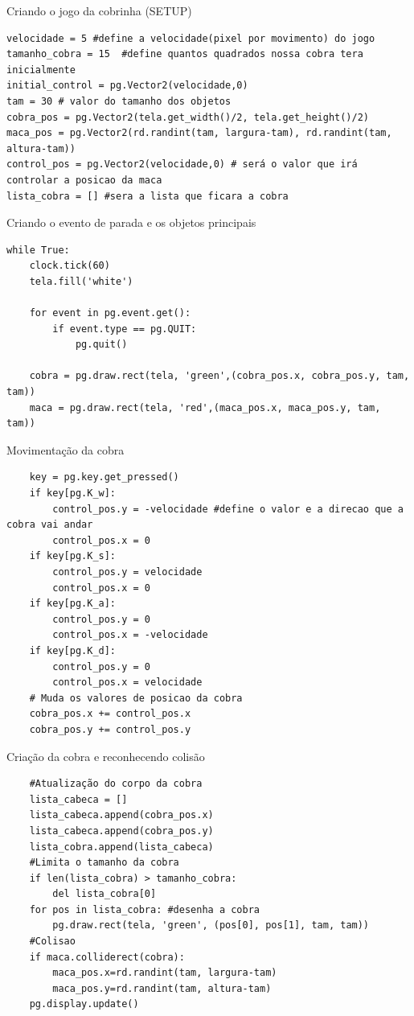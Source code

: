 \documentclass[fleqn,utf8,aspectratio=169,14pt]{beamer}
\begin{document}
	\begin{frame}[fragile]{Criando o jogo da cobrinha (SETUP)}
		
		\begin{lstlisting}
velocidade = 5 #define a velocidade(pixel por movimento) do jogo
tamanho_cobra = 15  #define quantos quadrados nossa cobra tera inicialmente
initial_control = pg.Vector2(velocidade,0)
tam = 30 # valor do tamanho dos objetos
cobra_pos = pg.Vector2(tela.get_width()/2, tela.get_height()/2)
maca_pos = pg.Vector2(rd.randint(tam, largura-tam), rd.randint(tam, altura-tam))
control_pos = pg.Vector2(velocidade,0) # será o valor que irá controlar a posicao da maca
lista_cobra = [] #sera a lista que ficara a cobra
		\end{lstlisting}
	\end{frame}
	
	\begin{frame}[fragile]{Criando o evento de parada e os objetos principais}
		\begin{lstlisting}
while True:   
	clock.tick(60)
	tela.fill('white')
	
	for event in pg.event.get():
		if event.type == pg.QUIT:
			pg.quit()
	
	cobra = pg.draw.rect(tela, 'green',(cobra_pos.x, cobra_pos.y, tam, tam))
	maca = pg.draw.rect(tela, 'red',(maca_pos.x, maca_pos.y, tam, tam))
		\end{lstlisting}
	\end{frame}
	
	\begin{frame}[fragile]{Movimentação da cobra}
		\begin{lstlisting}
	key = pg.key.get_pressed()
	if key[pg.K_w]:
		control_pos.y = -velocidade #define o valor e a direcao que a cobra vai andar
		control_pos.x = 0
	if key[pg.K_s]:
		control_pos.y = velocidade
		control_pos.x = 0
	if key[pg.K_a]:
		control_pos.y = 0
		control_pos.x = -velocidade
	if key[pg.K_d]:
		control_pos.y = 0
		control_pos.x = velocidade
	# Muda os valores de posicao da cobra
	cobra_pos.x += control_pos.x 
	cobra_pos.y += control_pos.y
		\end{lstlisting}
	\end{frame}
	
	\begin{frame}[fragile]{Criação da cobra e reconhecendo colisão}
		\begin{lstlisting}
	#Atualização do corpo da cobra
	lista_cabeca = []
	lista_cabeca.append(cobra_pos.x)
	lista_cabeca.append(cobra_pos.y)
	lista_cobra.append(lista_cabeca)
	#Limita o tamanho da cobra
	if len(lista_cobra) > tamanho_cobra:
		del lista_cobra[0]
	for pos in lista_cobra: #desenha a cobra
		pg.draw.rect(tela, 'green', (pos[0], pos[1], tam, tam))
	#Colisao
	if maca.colliderect(cobra):
		maca_pos.x=rd.randint(tam, largura-tam)
		maca_pos.y=rd.randint(tam, altura-tam)
	pg.display.update()
		\end{lstlisting}
	\end{frame}
	
\end{document}
